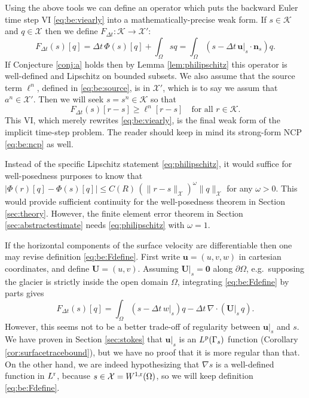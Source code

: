 \documentclass[hidelinks,onefignum,onetabnum,final]{siamart220329}  %
\newcommand{\grad}{\nabla}
\newcommand{\Div}{\nabla\cdot}
\newcommand{\bn}{\mathbf{n}}
\newcommand{\bu}{\mathbf{u}}
\newcommand{\bU}{\mathbf{U}}
\newcommand{\bzero}{\bm{0}}
\newcommand{\cK}{\mathcal{K}}
\newcommand{\cX}{\mathcal{X}}
\newcommand{\pp}{{\text{\textnormal{p}}}}
\newcommand{\rr}{{\text{\textnormal{r}}}}
\begin{document}
Using the above tools we can define an operator which puts the backward Euler time step VI \eqref{eq:be:viearly} into a mathematically-precise weak form.  If $s\in\cK$ and $q\in\cX$ then we define $F_{\Delta t}:\cK\to\cX'$:
\begin{equation}
F_{\Delta t}(s)[q] = \Delta t\,\Phi(s)[q] + \int_\Omega s q = \int_\Omega \left(s - \Delta t\, \bu|_s \cdot \bn_s\right) q.  \label{eq:be:Fdefine}
\end{equation}
If Conjecture \ref{conj:a} holds then by Lemma \ref{lem:philipschitz} this operator is well-defined and Lipschitz on bounded subsets.  We also assume that the source term $\ell^n$, defined in \eqref{eq:be:source}, is in $\cX'$, which is to say we assum that $a^n\in\cX'$.  Then we will seek $s = s^n \in \cK$ so that
\begin{equation}
\boxed{F_{\Delta t}(s)[r-s] \ge \ell^n[r-s] \quad \text{for all } r \in \cK.} \label{eq:be:vi}
\end{equation}
This VI, which merely rewrites \eqref{eq:be:viearly}, is the final weak form of the implicit time-step problem.  The reader should keep in mind its strong-form NCP \eqref{eq:be:ncp} as well.

Instead of the specific Lipschitz statement \eqref{eq:philipschitz}, it would suffice for well-posedness purposes to know  that $\Big|\Phi(r)[q] - \Phi(s)[q]\Big| \le C(R)\, (\|r-s\|_{\cX})^\omega \|q\|_{\cX}$ for any $\omega>0$.  This would provide sufficient continuity for the well-posedness theorem in Section \ref{sec:theory}.  However, the finite element error theorem in Section \ref{sec:abstractestimate} needs \eqref{eq:philipschitz} with $\omega=1$.

If the horizontal components of the surface velocity are differentiable then one may revise definition \eqref{eq:be:Fdefine}.  First write $\bu=(u,v,w)$ in cartesian coordinates, and define $\bU=(u,v)$.  Assuming $\bU|_s=\bzero$ along $\partial\Omega$, e.g.~supposing the glacier is strictly inside the open domain $\Omega$, integrating \eqref{eq:be:Fdefine} by parts gives
\begin{equation}
F_{\Delta t}(s)[q] = \int_\Omega \left(s - \Delta t\, w|_s\right) q - \Delta t\, \Div\left(\bU|_s\, q\right).  \label{eq:be:Fdefine:alt}
\end{equation}
However, this seems not to be a better trade-off of regularity between $\bu|_s$ and $s$.  We have proven in Section \ref{sec:stokes} that $\bu|_s$ is an $L^\pp(\Gamma_s)$ function (Corollary \ref{cor:surfacetracebound}), but we have no proof that it is more regular than that.  On the other hand, we are indeed hypothesizing that $\grad s$ is a well-defined function in $L^\rr$, because $s\in\cX=W^{1,\rr}(\Omega)$, so we will keep definition \eqref{eq:be:Fdefine}.
\end{document}
